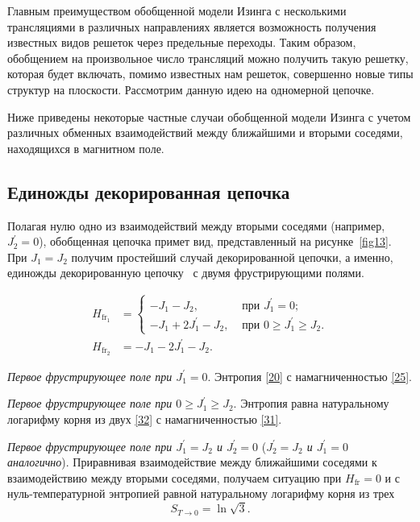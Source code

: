 Главным преимуществом обобщенной модели Изинга с несколькими трансляциями в различных направлениях является возможность получения известных видов решеток через предельные переходы. Таким образом, обобщением на произвольное число трансляций можно получить такую решетку, которая будет включать, помимо известных нам решеток, совершенно новые типы структур на плоскости. Рассмотрим данную идею на одномерной цепочке. 

Ниже приведены некоторые частные случаи обобщенной модели Изинга с учетом различных обменных взаимодействий между ближайшими и вторыми соседями, находящихся в магнитном поле. 

\subsection{Единожды декорированная цепочка}

Полагая нулю одно из взаимодействий между вторыми соседями (например, $J_2^{'} = 0$), обобщенная цепочка примет вид, представленный на рисунке~\ref{fig13}. При $J_1 = J_2$ получим простейший случай декорированной цепочки, а именно, единожды декорированную цепочку~\cite{stephenson1970} с двумя фрустрирующими полями.


\[
\begin{aligned}
H_{\text{fr}_1}&=
\begin{cases}
-J_{1}-J_{2}, & \text{ при } J_{1}^{'}=0; \\
-J_{1}+2J_{1}^{'}-J_{2}, & \text{ при } 0 \ge J_{1}^{'}\ge J_{2}.
\end{cases}\\
H_{\text{fr}_2}&=-J_{1}-2J_{1}^{'}-J_{2}.
\end{aligned}
\]

\emph{Первое фрустрирующее поле при $J_{1}^{'}=0$}.  Энтропия \eqref{20} с намагниченностью \eqref{25}.

\emph{Первое фрустрирующее поле при $0 \ge J_{1}^{'}\ge J_{2}$}. Энтропия равна натуральному логарифму корня из двух \eqref{32} с намагниченностью \eqref{31}.

\emph{Первое фрустрирующее поле при $J_1^{'} = J_2$ и $J_2^{'} = 0$} (\emph{$J_2^{'} = J_2$ и $J_1^{'} = 0$ аналогично}). Приравнивая взаимодействие между ближайшими соседями к взаимодействию между вторыми соседями, получаем ситуацию при $H_{\text{fr}} = 0$ и с нуль-температурной энтропией равной натуральному логарифму корня из трех 
\begin{equation}
S_{T\rightarrow 0}=\ln \sqrt{3}.
\label{39}
\end{equation}

